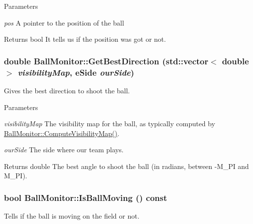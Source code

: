\begin{DoxyParams}{Parameters}
\item[{\em pos}]A pointer to the position of the ball \end{DoxyParams}
\begin{DoxyReturn}{Returns}
bool It tells us if the position was got or not. 
\end{DoxyReturn}
\hypertarget{classBallMonitor_a9045d5d3abf9c9b549303c831b3387e0}{
\subsubsection[{GetBestDirection}]{\setlength{\rightskip}{0pt plus 5cm}double BallMonitor::GetBestDirection (std::vector$<$ double $>$ {\em visibilityMap}, \/  eSide {\em ourSide})}}
\label{classBallMonitor_a9045d5d3abf9c9b549303c831b3387e0}


Gives the best direction to shoot the ball. 


\begin{DoxyParams}{Parameters}
\item[{\em visibilityMap}]The visibility map for the ball, as typically computed by \hyperlink{classBallMonitor_a0d2ef73ba2b0573021c800c311e08245}{BallMonitor::ComputeVisibilityMap()}. \item[{\em ourSide}]The side where our team plays. \end{DoxyParams}
\begin{DoxyReturn}{Returns}
double The best angle to shoot the ball (in radians, between -\/M\_\-PI and M\_\-PI). 
\end{DoxyReturn}
\hypertarget{classBallMonitor_a8995e71b82d80987984dd6b1ed89c0a0}{
\subsubsection[{IsBallMoving}]{\setlength{\rightskip}{0pt plus 5cm}bool BallMonitor::IsBallMoving () const}}
\label{classBallMonitor_a8995e71b82d80987984dd6b1ed89c0a0}


Tells if the ball is moving on the field or not. 

